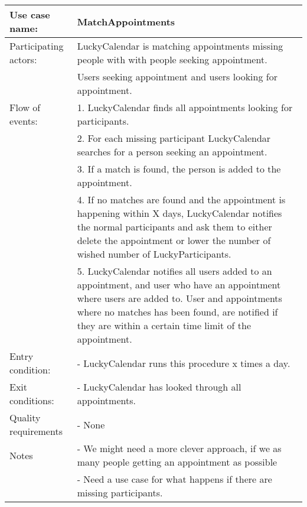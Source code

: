 {\tabulinesep=1.2mm
\begin{tabu}{ | p{3cm} | p{13cm} |}
    \hline
    Use case name: 			& 		MatchAppointments\\ \hline
    Participating actors:	& 		LuckyCalendar is matching appointments missing people with with people seeking appointment. \\
 							&		Users seeking appointment and users looking for appointment.\\ \hline
    Flow of events: 		& 		1. LuckyCalendar finds all appointments looking for participants. \\
							&		2. For each missing participant LuckyCalendar searches for a person seeking an appointment.\\
							&		3. If a match is found, the person is added to the appointment.\\
							&		4. If no matches are found and the appointment is happening within X days, LuckyCalendar notifies the normal participants and ask them to either delete the appointment or lower the number of wished number of LuckyParticipants.\\
							&		5. LuckyCalendar notifies all users added to an appointment, and user who have an appointment where users are added to. User and appointments where no matches has been found, are notified if they are within a certain time limit of the appointment.\\\hline
    Entry condition: 		& 		- LuckyCalendar runs this procedure x times a day. \\ \hline
	Exit conditions: 		&		- LuckyCalendar has looked through all appointments.\\\hline
	Quality requirements	&	 	- None \\\hline
	Notes					&	 	- We might need a more clever approach, if we as many people getting an appointment as possible \\
							&		- Need a use case for what happens if there are missing participants. \\\hline
\end{tabu}
}